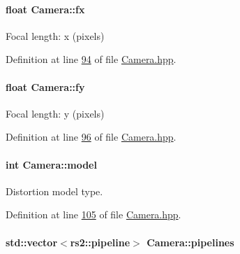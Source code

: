 \paragraph[{\texorpdfstring{fx}{fx}}]{\setlength{\rightskip}{0pt plus 5cm}float Camera\+::fx}\hypertarget{classCamera_a4f5e789525c1c9306028c080922582e2}{}\label{classCamera_a4f5e789525c1c9306028c080922582e2}


Focal length\+: x (pixels) 



Definition at line \hyperlink{Camera_8hpp_source_l00094}{94} of file \hyperlink{Camera_8hpp_source}{Camera.\+hpp}.

\paragraph[{\texorpdfstring{fy}{fy}}]{\setlength{\rightskip}{0pt plus 5cm}float Camera\+::fy}\hypertarget{classCamera_a1472650e23f3df5f23dda7f94537e889}{}\label{classCamera_a1472650e23f3df5f23dda7f94537e889}


Focal length\+: y (pixels) 



Definition at line \hyperlink{Camera_8hpp_source_l00096}{96} of file \hyperlink{Camera_8hpp_source}{Camera.\+hpp}.

\paragraph[{\texorpdfstring{model}{model}}]{\setlength{\rightskip}{0pt plus 5cm}int Camera\+::model}\hypertarget{classCamera_a3061c56d262cab256468f05b9d8838fc}{}\label{classCamera_a3061c56d262cab256468f05b9d8838fc}


Distortion model type. 



Definition at line \hyperlink{Camera_8hpp_source_l00105}{105} of file \hyperlink{Camera_8hpp_source}{Camera.\+hpp}.

\paragraph[{\texorpdfstring{pipelines}{pipelines}}]{\setlength{\rightskip}{0pt plus 5cm}std\+::vector$<$rs2\+::pipeline$>$ Camera\+::pipelines}\hypertarget{classCamera_a689d4141375d8f7fbf1651338c1ea9c0}{}\label{classCamera_a689d4141375d8f7fbf1651338c1ea9c0}


